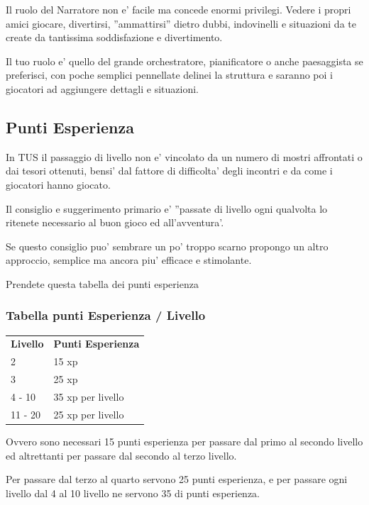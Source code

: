\documentclass[a4paper,11pt,twoside,openany]{book}
\begin{document}
{		Il ruolo del Narratore non e' facile ma concede enormi privilegi. Vedere i propri amici giocare, divertirsi, ''ammattirsi'' dietro dubbi, indovinelli e situazioni da te create da tantissima soddisfazione e divertimento.
		
		Il tuo ruolo e' quello del grande orchestratore, pianificatore o anche paesaggista se preferisci, con poche semplici pennellate delinei la struttura e saranno poi i giocatori ad aggiungere dettagli e situazioni.
		
		
		
		\subsection{Punti Esperienza}
		
		\label{punti-esperienza}
		
		In TUS il passaggio di livello non e' vincolato da un numero di mostri affrontati o dai tesori ottenuti, bensi' dal fattore di difficolta' degli incontri e da come i giocatori hanno giocato.
		
		Il consiglio e suggerimento primario e' ''passate di livello ogni qualvolta lo ritenete necessario al buon gioco ed all'avventura'.
		
		Se questo consiglio puo' sembrare un po' troppo scarno propongo un altro approccio, semplice ma ancora piu' efficace e stimolante.
		
		Prendete questa tabella dei punti esperienza
		
		\subsubsection{Tabella punti Esperienza / Livello}
		
		\label{tabella-punti-esperienza-livello}
		
		\begin{tabular}{ll}
			\toprule
			\textbf{Livello} & \textbf{Punti Esperienza}\tabularnewline
			2 & 15 xp\tabularnewline
			3 & 25 xp\tabularnewline
			4 - 10 & 35 xp per livello\tabularnewline
			11 - 20 & 25 xp per livello\tabularnewline
		\end{tabular}
		
		\bigskip
		
		Ovvero sono necessari 15 punti esperienza per passare dal primo al secondo livello ed altrettanti per passare dal secondo al terzo livello.
		
		Per passare dal terzo al quarto servono 25 punti esperienza, e per passare ogni livello dal 4 al 10 livello ne servono 35 di punti esperienza.
		
}
\end{document}

